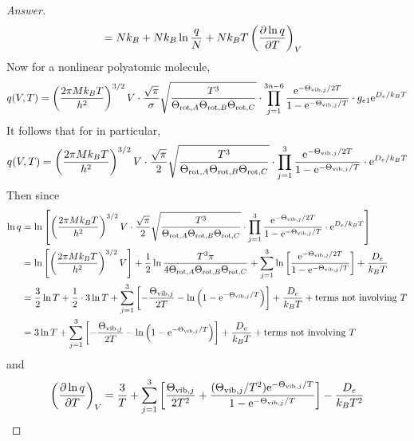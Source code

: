 \documentclass[../psets.tex]{subfiles}
\begin{document}
\begin{enumerate}
\begin{proof}[Answer]
\begin{align*}
            &= Nk_B+Nk_B\ln\frac{q}{N}+Nk_BT\left( \pdv{\ln q}{T} \right)_V
        \end{align*}
        Now for a nonlinear polyatomic molecule,
        \begin{equation*}
            q(V,T) = \left( \frac{2\pi Mk_BT}{h^2} \right)^{3/2}V\cdot\frac{\sqrt{\pi}}{\sigma}\sqrt{\frac{T^3}{\Theta_{\text{rot},A}\Theta_{\text{rot},B}\Theta_{\text{rot},C}}}\cdot\prod_{j=1}^{3n-6}\frac{\e[-\Theta_{\text{vib},j}/2T]}{1-\e[-\Theta_{\text{vib},j}/T]}\cdot g_{e1}\e[D_e/k_BT]
        \end{equation*}
        It follows that for  in particular,
        \begin{equation*}
            q(V,T) = \left( \frac{2\pi Mk_BT}{h^2} \right)^{3/2}V\cdot\frac{\sqrt{\pi}}{2}\sqrt{\frac{T^3}{\Theta_{\text{rot},A}\Theta_{\text{rot},B}\Theta_{\text{rot},C}}}\cdot\prod_{j=1}^{3}\frac{\e[-\Theta_{\text{vib},j}/2T]}{1-\e[-\Theta_{\text{vib},j}/T]}\cdot\e[D_e/k_BT]
        \end{equation*}
        Then since
        \begin{align*}
            \ln q &= \ln\left[ \left( \frac{2\pi Mk_BT}{h^2} \right)^{3/2}V\cdot\frac{\sqrt{\pi}}{2}\sqrt{\frac{T^3}{\Theta_{\text{rot},A}\Theta_{\text{rot},B}\Theta_{\text{rot},C}}}\cdot\prod_{j=1}^{3}\frac{\e[-\Theta_{\text{vib},j}/2T]}{1-\e[-\Theta_{\text{vib},j}/T]}\cdot\e[D_e/k_BT] \right]\\
            &= \ln\left[ \left( \frac{2\pi Mk_BT}{h^2} \right)^{3/2}V \right]+\frac{1}{2}\ln\frac{T^3\pi}{4\Theta_{\text{rot},A}\Theta_{\text{rot},B}\Theta_{\text{rot},C}}+\sum_{j=1}^3\ln\left[ \frac{\e[-\Theta_{\text{vib},j}/2T]}{1-\e[-\Theta_{\text{vib},j}/T]} \right]+\frac{D_e}{k_BT}\\
            &= \frac{3}{2}\ln T+\frac{1}{2}\cdot 3\ln T+\sum_{j=1}^3\left[ -\frac{\Theta_{\text{vib},j}}{2T}-\ln\left( 1-\e[-\Theta_{\text{vib},j}/T] \right) \right]+\frac{D_e}{k_BT}+\text{terms not involving }T\\
            &= 3\ln T+\sum_{j=1}^3\left[ -\frac{\Theta_{\text{vib},j}}{2T}-\ln\left( 1-\e[-\Theta_{\text{vib},j}/T] \right) \right]+\frac{D_e}{k_BT}+\text{terms not involving }T
        \end{align*}
        and
        \begin{align*}
            \left( \pdv{\ln q}{T} \right)_V &= \frac{3}{T}+\sum_{j=1}^3\left[ \frac{\Theta_{\text{vib},j}}{2T^2}+\frac{(\Theta_{\text{vib},j}/T^2)\e[-\Theta_{\text{vib},j}/T]}{1-\e[-\Theta_{\text{vib},j}/T]} \right]-\frac{D_e}{k_BT^2}\\

\end{align*}
\end{proof}
\end{enumerate}
\end{document}
